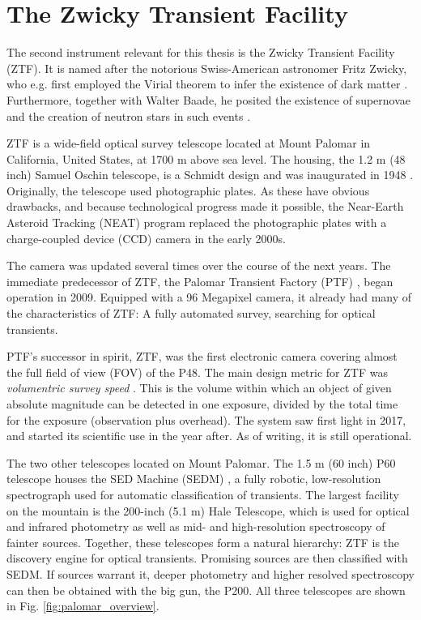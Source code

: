 \chapter{The Zwicky Transient Facility}
The second instrument relevant for this thesis is the Zwicky Transient Facility (ZTF). It is named after the notorious Swiss-American astronomer Fritz Zwicky, who e.g. first employed the Virial theorem to infer the existence of dark matter . Furthermore, together with Walter Baade, he posited the existence of supernovae and the creation of neutron stars in such events .

ZTF is a wide-field optical survey telescope located at Mount Palomar in California, United States, at 1700 m above sea level. The housing, the 1.2 m (48 inch) Samuel Oschin telescope, is a Schmidt design and was inaugurated in 1948 \cite{Harrington1952}. Originally, the telescope used photographic plates. As these have obvious drawbacks, and because technological progress made it possible, the Near-Earth Asteroid Tracking (NEAT) program  replaced the photographic plates with a charge-coupled device (CCD) camera in the early 2000s.

The camera was updated several times over the course of the next years. The immediate predecessor of ZTF, the Palomar Transient Factory (PTF) , began operation in 2009. Equipped with a 96 Megapixel camera, it already had many of the characteristics of ZTF: A fully automated survey, searching for optical transients.

PTF's successor in spirit, ZTF, was the first electronic camera covering almost the full field of view (FOV) of the P48. The main design metric for ZTF was \textit{volumentric survey speed} . This is the volume within which an object of given absolute magnitude can be detected in one exposure, divided by the total time for the exposure (observation plus overhead). The system saw first light in 2017, and started its scientific use in the year after. As of writing, it is still operational.

The two other telescopes located on Mount Palomar. The 1.5 m (60 inch) P60 telescope houses the SED Machine (SEDM) , a fully robotic, low-resolution spectrograph used for automatic classification of transients. The largest facility on the mountain is the 200-inch (5.1 m) Hale Telescope, which is used for optical and infrared photometry as well as mid- and high-resolution spectroscopy of fainter sources. Together, these telescopes form a natural hierarchy: ZTF is the discovery engine for optical transients. Promising sources are then classified with SEDM. If sources warrant it, deeper photometry and higher resolved spectroscopy can then be obtained with the big gun, the P200. All three telescopes are shown in Fig. \ref{fig:palomar_overview}.


